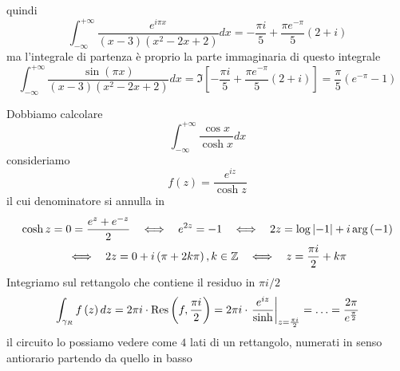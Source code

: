 quindi
\begin{equation*}
\int ^{ + \infty }_{ - \infty }\frac{e^{i\pi x}}{\left(x - 3\right)\left(x^{2} - 2x + 2\right)} dx = -\frac{\pi i}{5} + \frac{\pi e^{ - \pi }}{5}\left(2 + i\right)
\end{equation*}
ma l'integrale di partenza è proprio la parte immaginaria di questo integrale
\begin{equation*}
\int ^{ + \infty }_{ - \infty }\frac{\sin\left(\pi x\right)}{\left(x - 3\right)\left(x^{2} - 2x + 2\right)} dx = \Im \left[ - \frac{\pi i}{5} + \frac{\pi e^{ - \pi }}{5}\left(2 + i\right)\right] = \frac{\pi }{5}\left(e^{ - \pi } - 1\right)
\end{equation*}
\Soluzione

Dobbiamo calcolare
\begin{equation*}
\int ^{ + \infty }_{ - \infty }\frac{\cos x}{\cosh x} dx
\end{equation*}
consideriamo
\begin{equation*}
f\left(z\right) = \frac{e^{iz}}{\cosh z}
\end{equation*}
il cui denominatore si annulla in
\begin{gather*}
\cosh z = 0 = \frac{e^{z} + e^{ - z}}{2} \ \ \iff \ \ e^{2z} = - 1\ \ \iff \ \ 2z = \log\left| - 1\right| + i\arg\left(- 1\right)\\
\iff \ \ 2z = 0 + i\left(\pi + 2k\pi \right) ,k\in \ZZ  \ \ \iff \ \ z = \frac{\pi i}{2} + k\pi 
\end{gather*}
Integriamo sul rettangolo che contiene il residuo in $\pi i/2$
\begin{equation*}
\int _{\gamma _{R}} f\left(z\right) dz = 2\pi i\cdot \operatorname{Res} \left(f,\frac{\pi i}{2}\right) = 2\pi i\cdot \left. \frac{e^{iz}}{\sinh}\right| _{z = \frac{\pi i}{2}} = \dotsc = \frac{2\pi }{e^{\frac{\pi }{2}}}
\end{equation*}
il circuito lo possiamo vedere come $4$ lati di un rettangolo, numerati in senso antiorario partendo da quello in basso


